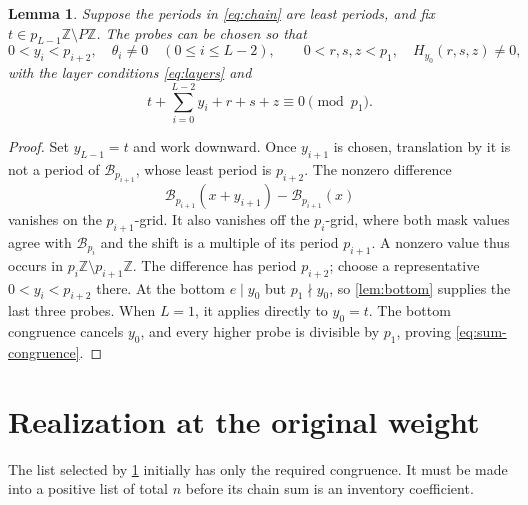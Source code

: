 \documentclass[11pt,a4paper]{amsart}
\numberwithin{equation}{section}
\theoremstyle{plain}
\newtheorem{lemma}[theorem]{Lemma}
\theoremstyle{definition}
\newcommand{\Z}{\mathbb Z}
\begin{document}
\begin{lemma}\label{lem:selection}
Suppose the periods in \eqref{eq:chain} are least periods, and fix
\(t\in p_{L-1}\Z\setminus P\Z\).  The probes can be chosen so that
\begin{equation}\label{eq:probe-bounds}
0<y_i<p_{i+2},\quad\theta_i\ne0\quad(0\le i\le L-2),
\qquad 0<r,s,z<p_1,\quad H_{y_0}(r,s,z)\ne0,
\end{equation}
with the layer conditions \eqref{eq:layers} and
\begin{equation}\label{eq:sum-congruence}
t+\sum_{i=0}^{L-2}y_i+r+s+z\equiv0\pmod{p_1}.
\end{equation}
\end{lemma}
\begin{proof}
Set \(y_{L-1}=t\) and work downward.  Once \(y_{i+1}\) is chosen,
translation by it is not a period of \(\mathcal B_{p_{i+1}}\), whose least period
is \(p_{i+2}\).  The nonzero difference
\[
\mathcal B_{p_{i+1}}(x+y_{i+1})-\mathcal B_{p_{i+1}}(x)
\]
vanishes on the \(p_{i+1}\)-grid.  It also vanishes off the
\(p_i\)-grid, where both mask values agree with \(\mathcal B_{p_i}\) and the
shift is a multiple of its period \(p_{i+1}\).  A nonzero value thus
occurs in \(p_i\Z\setminus p_{i+1}\Z\).  The difference has period
\(p_{i+2}\); choose a representative \(0<y_i<p_{i+2}\) there.
At the bottom \(e\mid y_0\) but \(p_1\nmid y_0\), so
\cref{lem:bottom} supplies the last three probes.  When \(L=1\), it
applies directly to \(y_0=t\).  The bottom congruence cancels \(y_0\),
and every higher probe is divisible by \(p_1\), proving
\eqref{eq:sum-congruence}.
\end{proof}

\section{Realization at the original weight}\label{sec:realization}

The list selected by \cref{lem:selection} initially has only the required
congruence.  It must be made into a positive list of total \(n\) before its
chain sum is an inventory coefficient.
\end{document}
